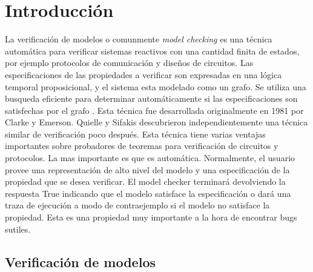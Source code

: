 \chapter{Introducción}
La verificación de modelos o comunmente \emph{model checking} es una técnica automática para verificar sistemas reactivos con una cantidad finita de estados, por ejemplo protocolos de comunicación y diseños de circuitos. Las especificaciones de las propiedades a verificar son expresadas en una lógica temporal proposicional, y el sistema esta modelado como un grafo. Se utiliza una busqueda eficiente para determinar automáticamente si las especificaciones son satisfechas por el grafo \cite{Clarke:5}. Esta técnica fue desarrollada originalmente en 1981 por Clarke y Emerson. Quielle y Sifakis descubrieron independientemente una técnica similar de verificación poco después.
Esta técnica tiene varias ventajas importantes sobre probadores de teoremas para verificación de circuitos y protocolos. La mas importante es que es automática. Normalmente, el usuario provee una representación de alto nivel del modelo y una especificación de la propiedad que se desea verificar. El model checker terminará devolviendo la respuesta True indicando que el modelo satisface la especificación o dará una traza de ejecución a modo de contraejemplo si el modelo no satisface la propiedad. Esta es una propiedad muy importante a la hora de encontrar bugs sutiles.

\section{Verificación de modelos}

